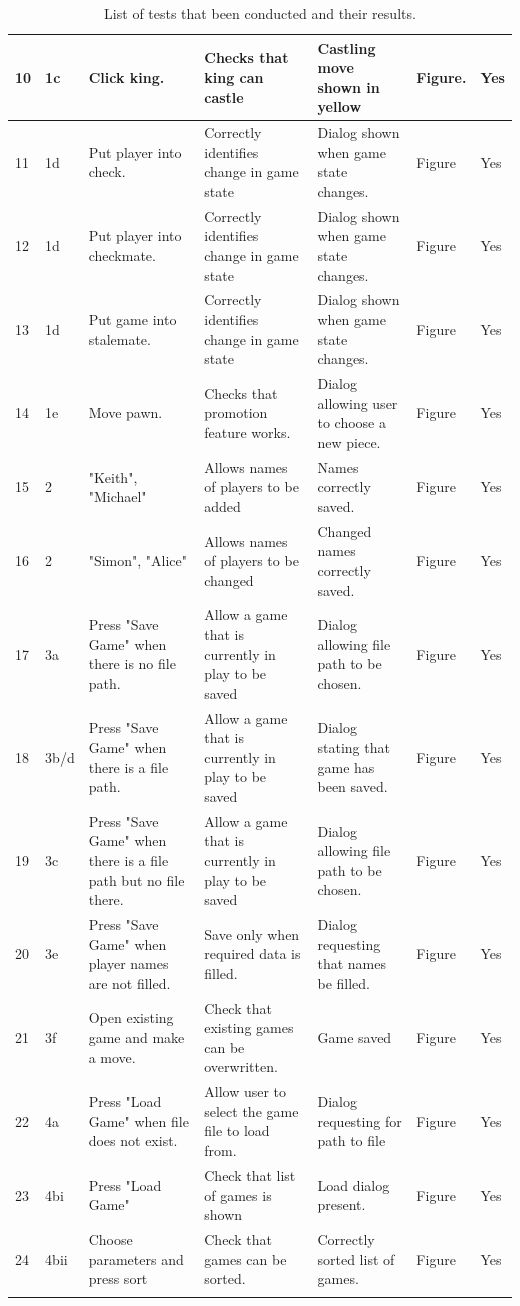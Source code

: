\documentclass[twoside, 12pt]{report}
\begin{document}
\begin{longtable}{|p{}|p{}|p{}|p{}|p{}|p{}|p{}|}
10 & 1c & Click king. & Checks that king can castle & Castling move shown in yellow & Figure. & Yes \\ \hline
11 & 1d & Put player into check. & Correctly identifies change in game state & Dialog shown when game state changes. & Figure & Yes \\ \hline
12 & 1d & Put player into checkmate. & Correctly identifies change in game state & Dialog shown when game state changes. & Figure & Yes \\ \hline
13 & 1d & Put game into stalemate. & Correctly identifies change in game state & Dialog shown when game state changes. & Figure & Yes \\ \hline
14 & 1e & Move pawn. & Checks that promotion feature works. & Dialog allowing user to choose a new piece. & Figure & Yes \\ \hline
15 & 2 & "Keith", "Michael" & Allows names of players to be added & Names correctly saved. & Figure & Yes \\ \hline
16 & 2 & "Simon", "Alice" & Allows names of players to be changed & Changed names correctly saved. & Figure & Yes \\ \hline
17 & 3a & Press "Save Game" when there is no file path. & Allow a game that is currently in play to be saved & Dialog allowing file path to be chosen. & Figure & Yes \\ \hline
18 & 3b/d & Press "Save Game" when there is a file path. & Allow a game that is currently in play to be saved & Dialog stating that game has been saved. & Figure & Yes \\ \hline
19 & 3c & Press "Save Game" when there is a file path but no file there.& Allow a game that is currently in play to be saved & Dialog allowing file path to be chosen. & Figure & Yes \\ \hline
20 & 3e & Press "Save Game" when player names are not filled. & Save only when required data is filled. & Dialog requesting that names be filled. & Figure & Yes \\ \hline
21 & 3f & Open existing game and make a move. & Check that existing games can be overwritten. & Game saved & Figure & Yes \\ \hline
22 & 4a & Press "Load Game" when file does not exist. & Allow user to select the game file to load from. & Dialog requesting for path to file & Figure & Yes \\ \hline
23 & 4bi & Press "Load Game" & Check that list of games is shown & Load dialog present. & Figure & Yes \\ \hline
24 & 4bii & Choose parameters and press sort & Check that games can be sorted. & Correctly sorted list of games. & Figure & Yes \\ \hline
\caption{List of tests that been conducted and their results.} 
\end{longtable}
\end{document}
